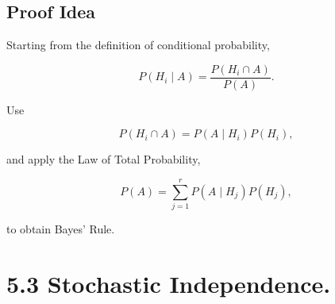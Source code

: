 \documentclass[12pt]{article}
\begin{document}
\subsection*{Proof Idea}

Starting from the definition of conditional probability,

\[
P(H_i\mid A)=\frac{P(H_i\cap A)}{P(A)}.
\]

Use

\[
P(H_i\cap A)=P(A\mid H_i)P(H_i),
\]

and apply the Law of Total Probability,

\[
P(A)=\sum_{j=1}^{r} P(A\mid H_j)P(H_j),
\]

to obtain Bayes' Rule.

\section*{5.3 Stochastic Independence.}
\end{document}
